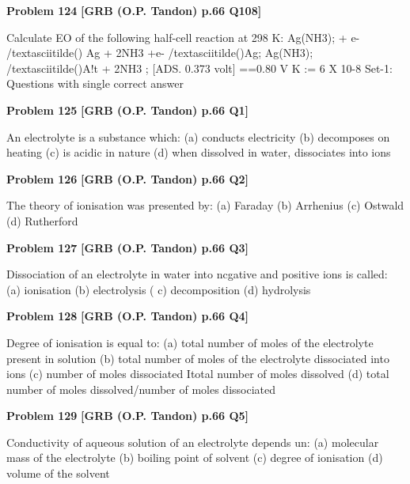 \begin{problembox}
\textbf{Problem 124} \hfill \textbf{[GRB (O.P. Tandon) p.66 Q108]}
\label{q:ext-grb_all_questions-124}

Calculate EO of the following half-cell reaction at 298 K: 
Ag(NH3); + e- /textasciitilde() 
Ag + 2NH3 
+e- /textasciitilde()Ag; 
Ag(NH3); /textasciitilde()A!t + 2NH3 ; 
[ADS. 
0.373 volt] 
==0.80 V 
K := 6 X 10-8 
Set-1: Questions with single correct answer
\end{problembox}

\begin{problembox}
\textbf{Problem 125} \hfill \textbf{[GRB (O.P. Tandon) p.66 Q1]}
\label{q:ext-grb_all_questions-125}

An electrolyte is a substance which: 
(a) conducts electricity 
(b) decomposes on heating 
(c) is acidic in nature 
(d) when dissolved in water, dissociates into ions
\end{problembox}

\begin{problembox}
\textbf{Problem 126} \hfill \textbf{[GRB (O.P. Tandon) p.66 Q2]}
\label{q:ext-grb_all_questions-126}

The theory of ionisation was presented by: 
(a) Faraday 
(b) Arrhenius (c) Ostwald 
(d) Rutherford
\end{problembox}

\begin{problembox}
\textbf{Problem 127} \hfill \textbf{[GRB (O.P. Tandon) p.66 Q3]}
\label{q:ext-grb_all_questions-127}

Dissociation of an electrolyte in water into ncgative and 
positive ions is called: 
(a) ionisation 
(b) electrolysis 
( c) decomposition 
(d) hydrolysis
\end{problembox}

\begin{problembox}
\textbf{Problem 128} \hfill \textbf{[GRB (O.P. Tandon) p.66 Q4]}
\label{q:ext-grb_all_questions-128}

Degree of ionisation is equal to: 
(a) total number of moles of the electrolyte present in solution 
(b) total number of moles of the electrolyte dissociated into 
ions 
(c) number of moles dissociated Itotal number of moles 
dissolved 
(d) total number of moles dissolved/number of moles dissociated
\end{problembox}

\begin{problembox}
\textbf{Problem 129} \hfill \textbf{[GRB (O.P. Tandon) p.66 Q5]}
\label{q:ext-grb_all_questions-129}

Conductivity of aqueous solution of an electrolyte depends un: 
(a) molecular mass of the electrolyte 
(b) boiling point of solvent 
(c) degree of ionisation 
(d) volume of the solvent
\end{problembox}

